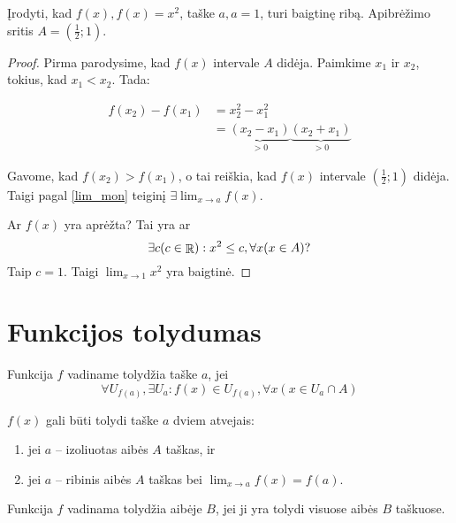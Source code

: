 \begin{exmp}
  Įrodyti, kad $f(x), f(x) = x^2$, taške $a, a = 1$, turi baigtinę ribą.
  Apibrėžimo sritis $A = \left( \frac{1}{2}; 1 \right)$.

  \begin{proof}
    Pirma parodysime, kad $f(x)$ intervale $A$ didėja. Paimkime 
    $x_{1}$ ir $x_{2}$, tokius, kad $x_{1} < x_{2}$. Tada:

    \begin{align*}
      f(x_{2}) - f(x_{1}) 
      &= x _{2} ^{2} - x _{1} ^{2} \\
      &= \underbrace{(x_{2} - x_{1})}_{> 0}
        \underbrace{(x_{2} + x_{1})}_{> 0}
    \end{align*}

    Gavome, kad $f(x_{2}) > f(x_{1})$, o tai reiškia, kad $f(x)$ intervale
    $\left( \frac{1}{2} ; 1 \right)$ didėja. Taigi pagal \ref{lim_mon}
    teiginį $\exists \lim _{x \to a} f(x)$.

    Ar $f(x)$ yra aprėžta? Tai yra ar
    \begin{equation*}
      \exists c (c \in \mathop{\mathbb{R}}) : x^{2} \leq c, \forall x (x \in A)?
    \end{equation*}
    Taip $c = 1$. Taigi $\lim _{x \to 1} x^{2}$ yra baigtinė.
  \end{proof}
\end{exmp}

\section{Funkcijos tolydumas}

\begin{defn}
  Funkcija $f$ vadiname tolydžia taške $a$, jei 
  \begin{equation*}
    \forall U_{f(a)}, \exists U_{a} : 
      f(x) \in U_{f(a)}, \forall x (x \in U_{a} \cap A)
  \end{equation*}
\end{defn}

$f(x)$ gali būti tolydi taške $a$ dviem atvejais:
\begin{enumerate}
  \item jei $a$ – izoliuotas aibės $A$ taškas, ir 
  \item jei $a$ – ribinis aibės $A$ taškas bei 
    $\lim _{x \to a} f(x) = f(a)$.
\end{enumerate}

\begin{defn}
  Funkcija $f$ vadinama tolydžia aibėje $B$, jei ji yra tolydi visuose
  aibės $B$ taškuose.
\end{defn}

